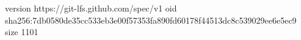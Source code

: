 version https://git-lfs.github.com/spec/v1
oid sha256:7db0580de35cc533eb3e00f57353fa890fd60178f44513dc8c539029ee6e5ec9
size 1101
